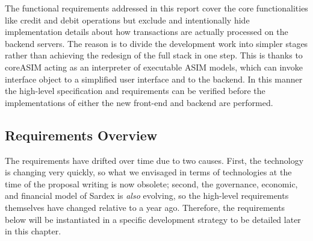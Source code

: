The functional requirements addressed in this report cover the core functionalities like credit and debit operations but exclude and intentionally hide implementation details about how transactions are actually processed on the backend servers. The reason is to divide the development work into simpler stages rather than achieving the redesign of the full stack in one step. This is thanks to coreASIM acting as an interpreter of executable ASIM models, which can invoke interface object to a simplified user interface and to the backend. In this manner the high-level specification and requirements can be verified before the implementations of either the new front-end and backend are performed.

\subsection{Requirements Overview}\label{_requirements_overview}
The requirements have drifted over time due to two causes. First, the technology is changing very quickly, so what we envisaged in terms of technologies at the time of the proposal writing is now obsolete; second, the governance, economic, and financial model of Sardex is \emph{also} evolving, so the high-level requirements themselves have changed relative to a year ago. Therefore, the requirements below will be instantiated in a specific development strategy to be detailed later in this chapter.
\setcounter{table}{0}
\setlength{\tabcolsep}{10pt}
